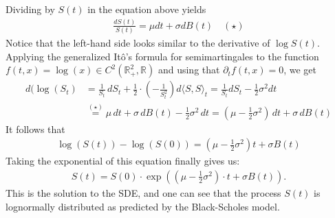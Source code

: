 \documentclass[11pt,a4paper, final]{article}
\begin{document}
Dividing by $S(t)$ in the equation above yields
\begin{align*}\frac{dS(t)}{S(t)}=\mu dt + \sigma dB(t)\quad (\star) \end{align*}
Notice that the left-hand side looks similar to the derivative of $\log{S(t)}$.\\
Applying the generalized Itô's formula for semimartingales to the function $f(t,x)=\log(x)\in C^2(\mathbb{R}_+^2,\mathbb{R})$ and using that $\partial_t f(t,x)=0$, we get 
\begin{align*}
d(\log(S_t)&=\frac{1}{S_t} \, dS_t + \frac{1}{2}\cdot \left(-\frac{1}{S^2_t} \right) d\langle S,S\rangle_t 
= \frac{1}{S_t} dS_t -\frac{1}{2} \sigma^2 dt \\
&\stackrel{(\star)}{=} \mu \, dt + \sigma \, dB(t) -\frac{1}{2} \sigma^2 \, dt
=\left(\mu -\frac{1}{2} \sigma^2\right)\, dt + \sigma \, dB(t)
\end{align*}
It follows that
\begin{align*}\log(S(t))-\log(S(0)) =\left(\mu -\frac{1}{2} \sigma^2\right)t + \sigma B(t)
\end{align*}
Taking the exponential of this equation finally gives us:
\begin{align*}
S(t)=S(0) \cdot \exp\left( \left(\mu - \frac{1}{2}\sigma^2\right)\cdot t + \sigma B(t)\right).
\end{align*}
This is the solution to the SDE, and one can see that the process $S(t)$ is lognormally distributed as predicted by the Black-Scholes model.
\end{document}
